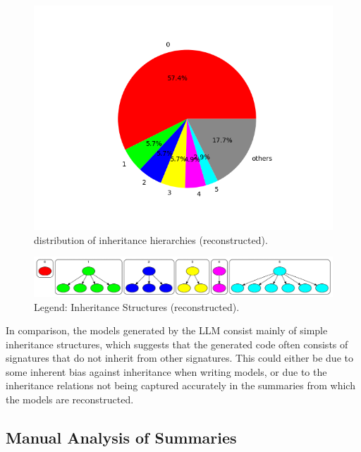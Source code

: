 \documentclass[conference]{IEEEtran}
\begin{document}
    
    \begin{figure}[htbp]
    \centerline{\includegraphics[width=\linewidth]{"./distribution of inheritance hierarchies (reconstructed).png"}}
    \caption{distribution of inheritance hierarchies (reconstructed).}
    \label{fig}
    \end{figure}

    \begin{figure}[htbp]
        \centerline{\includegraphics[width=\linewidth]{"./out/reconstructed.png"}}
        \caption{Legend: Inheritance Structures (reconstructed).}
        \label{fig}
        \end{figure}



In comparison, the models generated by the LLM consist mainly of simple inheritance structures, which suggests that the generated code often consists of signatures that do not inherit from other signatures. This could either be due to some inherent bias against inheritance when writing models, or due to the inheritance relations not being captured accurately in the summaries from which the models are reconstructed.

\subsection{Manual Analysis of Summaries}
\end{document}
